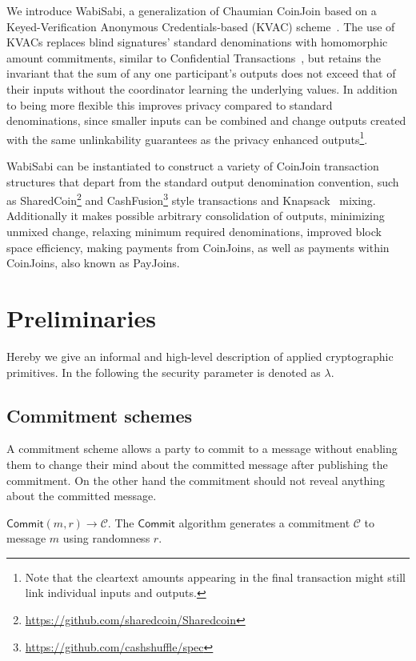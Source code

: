 \documentclass{article}
\begin{document}
We introduce WabiSabi, a generalization of Chaumian CoinJoin based on a Keyed-Verification Anonymous Credentials-based (KVAC) scheme~\cite{chase2019signal}. The use of KVACs replaces blind signatures' standard denominations with homomorphic amount commitments, similar to Confidential Transactions~\cite{maxwell2016confidential}, but retains the invariant that the sum of any one participant's outputs does not exceed that of their inputs without the coordinator learning the underlying values. In addition to being more flexible this improves privacy compared to standard denominations, since smaller inputs can be combined and change outputs created with the same unlinkability guarantees as the privacy enhanced outputs\footnote{Note that the cleartext amounts appearing in the final transaction might still link individual inputs and outputs.}.

WabiSabi can be instantiated to construct a variety of CoinJoin transaction structures that depart from the standard output denomination convention, such as SharedCoin\footnote{\url{https://github.com/sharedcoin/Sharedcoin}} and CashFusion\footnote{\url{https://github.com/cashshuffle/spec}} style transactions and Knapsack~\cite{maurer2017anonymous} mixing. Additionally it makes possible arbitrary consolidation of outputs, minimizing unmixed change, relaxing minimum required denominations, improved block space efficiency, making payments from CoinJoins, as well as payments within CoinJoins, also known as PayJoins.

\section{Preliminaries}

Hereby we give an informal and high-level description of applied cryptographic primitives. In the following the security parameter is denoted as $\lambda$.

\subsection{Commitment schemes}
A commitment scheme allows a party to commit to a message without enabling them to change their mind about the committed message after publishing the commitment. On the other hand the commitment should not reveal anything about the committed message.

\noindent$\mathsf{Commit}(m,r)\xrightarrow{}\mathcal{C}$. The $\mathsf{Commit}$ algorithm generates a commitment $\mathcal{C}$ to message $m$ using randomness $r$.
\end{document}
